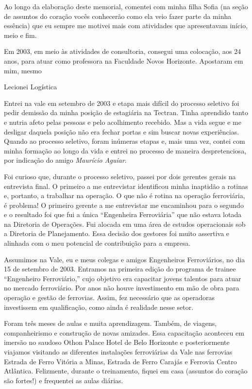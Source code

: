 \documentclass[
]{book}
\begin{document}
Ao longo da elaboração deste memorial, comentei com minha filha Sofia
(na seção de assuntos do coração vocês conhecerão como ela veio fazer
parte da minha essência) que eu sempre me motivei mais com atividades
que apresentavam início, meio e fim.

Em 2003, em meio às atividades de consultoria, consegui uma colocação,
aos 24 anos, para atuar como professora na Faculdade Novos Horizonte.
Apostaram em mim, mesmo

Lecionei Logística

Entrei na vale em setembro de 2003 e etapa mais difícil do processo
seletivo foi pedir demissão da minha posição de estagiária na Tectran.
Tinha aprendido tanto e nutria afeto pelas pessoas e pelo acolhimento
recebido. Mas a vida segue e me desligar daquela posição não era fechar
portas e sim buscar novas experiências. Quando ao processo seletivo,
foram inúmeras etapas e, mais uma vez, contei com minha formação ao
longo da vida e entrei no processo de maneira despretenciosa, por
indicação do amigo \emph{Maurício Aguiar}.

Foi curioso que, durante o processo seletivo, passei por dois gerentes
gerais na entrevista final. O primeiro a me entrevistar identificou
minha inaptidão a rotinas e, portanto, a trabalhar na operação. O que
não é rotina na operação ferroviária, é problema! O primeiro gerente a
me entrevistar me encaminhou para o segundo e o resultado foi que fui a
única ``Engenheira Ferroviária'' que não estava lotada na Diretoria de
Operações. Fui alocada em uma área de estudos operacionais sob a
Diretoria de Planejamento. Essa decisão dos gestores foi muito assertiva
e alinhada com o meu potencial de contribuição para a empresa.

Assumimos na Vale, eu e meus colegas e amigos Engenheiros Ferroviários,
no dia 15 de setembro de 2003. Entramos na primeira edição do programa
de trainee ``Engenheiro Ferroviário,'' cujo objetivo era capacitar
jovens talentos para atuar no mercado ferroviário. Por anos não houve
investimento em mão de obra para operação e gestão de ferrovias. Assim,
fez necessário que as operadoras investissem em qualificação, como ainda
é realidade nesse setor.

Foram três meses de aulas e muita aprendizagem. Também, de viagens,
companheirismo e construção de novas amizades. Essa capacitação
aconteceu em imersão no saudoso Othon Palace Hotel de Belo Horizonte e
posteriormente viajamos visitando as diferentes instalações ferroviárias
da Vale nas ferrovias Estrada de Ferro Vitória a Minas, Estrada de Ferro
Carajás e Ferrovia Centro Atlântica. Felizmente, durante o treinamento,
fiquei em casa (assuntos do coração são fortes!) e frequentei as aulas
diárias.
\end{document}
